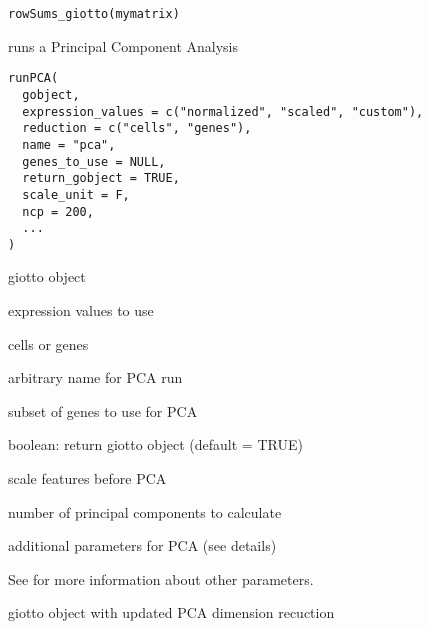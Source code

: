 \documentclass[a4paper]{book}
\begin{document}
%
\begin{Usage}
\begin{verbatim}
rowSums_giotto(mymatrix)
\end{verbatim}
\end{Usage}
%
\begin{Description}\relax
runs a Principal Component Analysis
\end{Description}
%
\begin{Usage}
\begin{verbatim}
runPCA(
  gobject,
  expression_values = c("normalized", "scaled", "custom"),
  reduction = c("cells", "genes"),
  name = "pca",
  genes_to_use = NULL,
  return_gobject = TRUE,
  scale_unit = F,
  ncp = 200,
  ...
)
\end{verbatim}
\end{Usage}
%
\begin{Arguments}
\begin{ldescription}
\item[\code{gobject}] giotto object

\item[\code{expression\_values}] expression values to use

\item[\code{reduction}] cells or genes

\item[\code{name}] arbitrary name for PCA run

\item[\code{genes\_to\_use}] subset of genes to use for PCA

\item[\code{return\_gobject}] boolean: return giotto object (default = TRUE)

\item[\code{scale\_unit}] scale features before PCA

\item[\code{ncp}] number of principal components to calculate

\item[\code{...}] additional parameters for PCA (see details)
\end{ldescription}
\end{Arguments}
%
\begin{Details}\relax
See  for more information about other parameters.
\end{Details}
%
\begin{Value}
giotto object with updated PCA dimension recuction
\end{Value}
\end{document}

